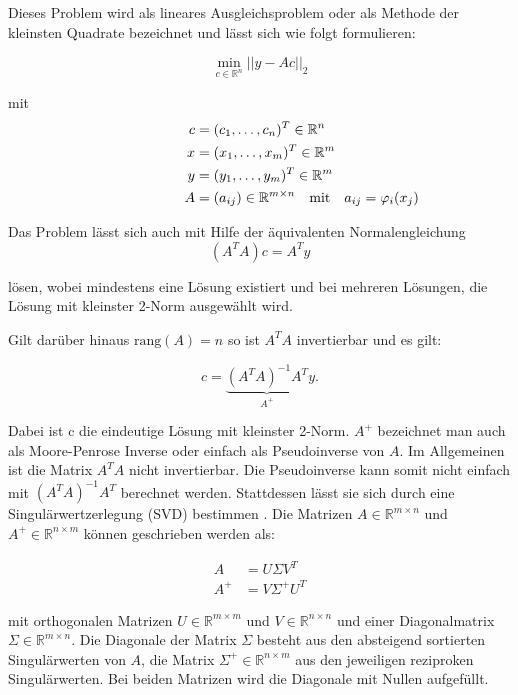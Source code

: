 Dieses Problem wird als lineares Ausgleichsproblem oder als Methode der kleinsten Quadrate bezeichnet und lässt sich wie folgt formulieren:

\[
\min_{c\in\mathbb{R}^n} ||y - Ac||_2
\]

mit
\[
\begin{aligned}
c &= (c_1,\dotsc,c_n)^T\in\mathbb{R}^n \\
x &= (x_1,\dotsc,x_m)^T\in\mathbb{R}^m \\
y &= (y_1,\dotsc,y_m)^T\in\mathbb{R}^m \\
A &= (a_{ij})\in\mathbb{R}^{m\times n} \rlap{\quad\text{mit}\quad $a_{ij} = \varphi_i(x_j)$}
\end{aligned}
\]

Das Problem lässt sich auch mit Hilfe der äquivalenten Normalengleichung
\[
	(A^TA)c = A^Ty
\]

lösen, wobei mindestens eine Lösung existiert und bei mehreren Lösungen, die Lösung mit kleinster 2-Norm ausgewählt wird.

Gilt darüber hinaus $\text{rang}\left(A\right) = n$ so ist $A^TA$ invertierbar und es gilt:

\begin{equation}\label{eq:normaleq}
c = \underbrace{(A^TA)^{-1}A^T}_{A^+}y.
\end{equation}

Dabei ist c die eindeutige Lösung mit kleinster 2-Norm. $A^+$ bezeichnet man auch als Moore-Penrose Inverse oder einfach als Pseudoinverse von $A$. Im Allgemeinen ist die Matrix $A^TA$ nicht invertierbar. Die Pseudoinverse kann somit nicht einfach mit $(A^TA)^{-1}A^T$ berechnet werden. Stattdessen lässt sie sich durch eine Singulärwertzerlegung (SVD) bestimmen \cite{Stoer2011}. Die Matrizen $A\in\mathbb{R}^{m\times n}$ und $A^+\in\mathbb{R}^{n\times m}$ können geschrieben werden als:

\[
\begin{aligned}
A &= U\Sigma V^T \\
A^+ &= V\Sigma^+U^T
\end{aligned}
\]

mit orthogonalen Matrizen $U\in\mathbb{R}^{m\times m}$ und $V\in\mathbb{R}^{n\times n}$ und einer Diagonalmatrix $\Sigma\in\mathbb{R}^{m\times n}$.
Die Diagonale der Matrix $\Sigma$ besteht aus den absteigend sortierten Singulärwerten von $A$, die Matrix $\Sigma^+\in\mathbb{R}^{n\times m}$ aus den jeweiligen reziproken Singulärwerten. Bei beiden Matrizen wird die Diagonale mit Nullen aufgefüllt.


